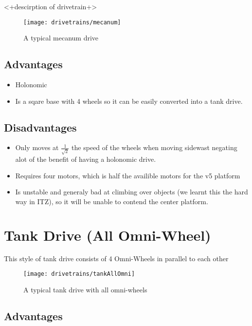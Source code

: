 \documentclass[../../main.tex]{subfiles}
\begin{document}
<+descirption of drivetrain+>

\begin{figure}[h]
	\centering
	\texttt{[image: drivetrains/mecanum]}
	\caption{A typical mecanum drive}
	\label{fig:drivetrainMecanum}
\end{figure}

\subsection{Advantages}

\begin{itemize}
	\item Holonomic
	\item Is a sqare base with 4 wheels so it can be easily converted
	      into a tank drive.
\end{itemize}


\subsection{Disadvantages}

\begin{itemize}
	\item Only moves at $\frac{1}{\sqrt{2}}$ the speed of the wheels when moving sidewast
	      negating alot of the benefit of having a holonomic drive.
	\item Requires four motors, which is half the availible motors for the v5 platform
	\item Is unstable and generaly bad at climbing over objects (we learnt this the hard
	      way in ITZ), so it will be unable to contend the center platform.
\end{itemize}



\section{Tank Drive (All Omni-Wheel)}

This style of tank drive consists of 4 Omni-Wheels in parallel to each other

\begin{figure}[h]
	\centering
	\texttt{[image: drivetrains/tankAllOmni]}
	\caption{A typical tank drive with all omni-wheels}
	\label{fig:drivetrainTankAllOmni}
\end{figure}

\subsection{Advantages}
\end{document}
